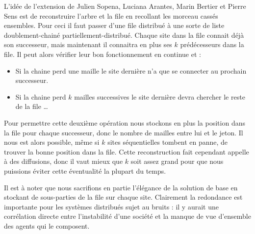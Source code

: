 L'idée de l'extension de \mbox{Julien} \mbox{Sopena}, \mbox{Luciana} \mbox{Arantes}, \mbox{Marin} \mbox{Bertier} et \mbox{Pierre} \mbox{Sens} est de reconstruire l'arbre et la file en recollant les morceau cassés ensembles. Pour ceci il faut passer d'une file distribué à une sorte de liste doublement-chainé partiellement-distribué. Chaque site dans la file connait déjà son successeur, mais maintenant il connaitra en plus ses $k$ prédécesseurs dans la file. Il peut alors vérifier leur bon fonctionnement en continue et :

\begin{itemize}
\item Si la chaine perd une maille le site dernière n'a que se connecter au prochain successeur.
\item Si la chaine perd $k$ mailles successives le site dernière devra chercher le reste de la file \dots
\end{itemize}

Pour permettre cette deuxième opération nous stockons en plus la position dans la file pour chaque successeur, donc le nombre de mailles entre lui et le jeton. Il nous est alors possible, même si $k$ sites séquentielles tombent en panne, de trouver la bonne position dans la file. Cette reconstruction fait cependant appelle à des diffusions, donc il vaut mieux que $k$ soit assez grand pour que nous puissions éviter cette éventualité la plupart du temps.

Il est à noter que nous sacrifions en partie l'élégance de la solution de base en stockant de sous-parties de la file sur chaque site. Clairement la redondance est importante pour les systèmes distribués sujet au bruits : il y aurait une corrélation directe entre l'instabilité d'une société et la manque de vue d'ensemble des agents qui le composent.